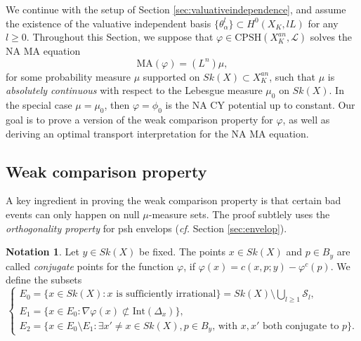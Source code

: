 \documentclass[a4paper]{article}
\theoremstyle{definition}
\newtheorem*{Notation}{Notation}
\newcommand{\cf}{\emph{cf.} }
\begin{document}
	
	
	We continue with the setup of Section \ref{sec:valuativeindependence}, and assume the existence of the valuative independent basis $\{ \theta_\alpha^l \}\subset H^0(X_K, lL)$ for any $l\geq 0$. Throughout this Section, we suppose that $\varphi\in \text{CPSH}(X_K^{an},\mathcal{L})$ solves the NA MA equation
	\begin{equation}
			\text{MA}(\varphi )=(L^n) \mu,
	\end{equation}
	for some probability measure $\mu$ supported on $Sk(X)\subset X_K^{an}$, such that $\mu$ 
	is \emph{absolutely continuous} with respect to 
	 the Lebesgue measure $\mu_0$ on $Sk(X)$. In the special case $\mu=\mu_0$, then $\varphi=\phi_0$ is the NA CY potential up to constant.
Our goal is to prove a version of the weak comparison property for $\varphi$, as well as deriving an optimal transport interpretation for the NA MA equation.
	
	
	
	
	

	
	
	
	
	
	\subsection{Weak comparison property}\label{sec:weakcomparison}
	
	
	
	
A key ingredient in proving the weak comparison property is that certain bad events can only happen on null  $\mu$-measure sets. The proof  subtlely uses the \emph{orthogonality property} for psh envelops  (\cf Section \ref{sec:envelop}).



\begin{Notation}
Let $y\in Sk(X)$ be fixed. The points $x\in Sk(X)$ and $p\in B_y$ are called \emph{conjugate} points for the function $\varphi$, if $\varphi(x)= c(x,p;y)-\varphi^c(p)$.
We define the subsets 
\[
\begin{cases}
E_0= \{     x\in Sk(X):    \text{$x$ is sufficiently irrational}     \}= Sk(X)\setminus \bigcup_{l\geq 1} \mathcal{S}_l  ,
\\
E_1= \{       x\in E_0:     \nabla   \varphi(x) \not\subset \text{Int}(\Delta_x)   \},
\\
E_2= \{      x\in E_0\setminus E_1:    \text{$\exists x'\neq x\in Sk(X), p\in B_y$, with $x,x'$ both conjugate to $p$}      \}.
\end{cases}
\]







\end{Notation}
\end{document}
